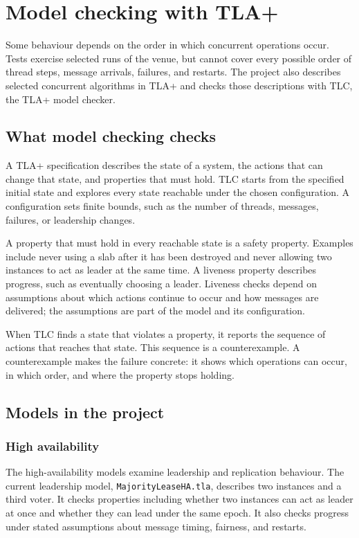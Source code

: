 \chapter{Model checking with TLA+}
\label{ch:model_checking}

Some behaviour depends on the order in which concurrent operations occur. Tests exercise
selected runs of the venue, but cannot cover every possible order of thread steps, message
arrivals, failures, and restarts. The project also describes selected concurrent algorithms
in TLA+ and checks those descriptions with TLC, the TLA+ model checker.

\section{What model checking checks}

A TLA+ specification describes the state of a system, the actions that can change that
state, and properties that must hold. TLC starts from the specified initial state and
explores every state reachable under the chosen configuration. A configuration sets finite
bounds, such as the number of threads, messages, failures, or leadership changes.

A property that must hold in every reachable state is a safety property. Examples include
never using a slab after it has been destroyed and never allowing two instances to act as
leader at the same time. A liveness property describes progress, such as eventually
choosing a leader. Liveness checks depend on assumptions about which actions continue to
occur and how messages are delivered; the assumptions are part of the model and its
configuration.

When TLC finds a state that violates a property, it reports the sequence of actions that
reaches that state. This sequence is a counterexample. A counterexample makes the
failure concrete: it shows which operations can occur, in which order, and where the
property stops holding.

\section{Models in the project}

\subsection{High availability}

The high-availability models examine leadership and replication behaviour. The current
leadership model, \texttt{MajorityLeaseHA.tla}, describes two instances and a third voter.
It checks properties including whether two instances can act as leader at once and whether
they can lead under the same epoch. It also checks progress under stated assumptions about
message timing, fairness, and restarts.

